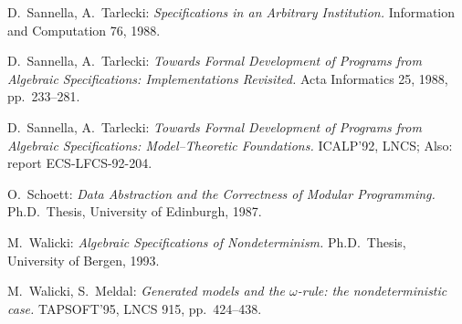\begin{thebibliography}{Nip 86}
    D.\ Sannella, A.\ Tarlecki: {\em
       Specifications in an Arbitrary Institution.} Information and
       Computation 76, 1988.

    D.\ Sannella, A.\ Tarlecki: {\em Towards
       Formal Development of Programs from Algebraic Specifications:
       Implementations Revisited.} Acta Informatics 25, 1988, pp.\
       233--281.

    D.\ Sannella, A.\ Tarlecki: {\em Towards
       Formal Development of Programs from Algebraic Specifications:
       Model--Theoretic Foundations.} ICALP'92, LNCS; Also: report
       ECS-LFCS-92-204.

    O.\ Schoett: {\em Data Abstraction and the
       Correctness of Modular Programming.} Ph.D.\ Thesis, University
       of Edinburgh, 1987.

    M.\ Walicki: {\em Algebraic Specifications
       of Nondeterminism.} Ph.D.\ Thesis, University of Bergen, 1993.

    M.\ Walicki, S.\ Meldal: {\em Generated
       models and the $\omega$-rule: the nondeterministic case.} 
       TAPSOFT'95, LNCS 915, pp.\ 424--438. 
       
\end{thebibliography}





